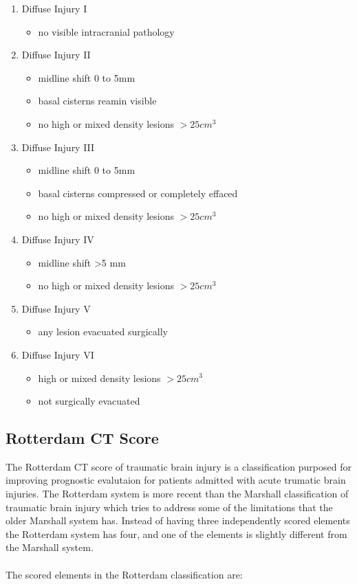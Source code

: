 \documentclass[11pt]{article}
\begin{document}
\begin{enumerate}
\item{Diffuse Injury I}
  \begin{itemize}
    \item{no visible intracranial pathology}
  \end{itemize}
\item{Diffuse Injury II}
  \begin{itemize}
   \item{midline shift 0 to 5mm}
    \item{basal cisterns reamin visible}
    \item{no high  or mixed density lesions $>25 cm^3$}
  \end{itemize}
\item{Diffuse Injury III}
  \begin{itemize}
    \item{midline shift 0 to 5mm}
    \item{basal cisterns compressed or completely effaced}
    \item{no high or mixed density lesions $>25cm^3$}
  \end{itemize}
\item{Diffuse Injury IV}
  \begin{itemize}
    \item{midline shift >5 mm}
    \item{no high or mixed density lesions $>25cm^3$}
  \end{itemize}
\item{Diffuse Injury V}
  \begin{itemize}
    \item{any lesion evacuated surgically}
  \end{itemize}
\item{Diffuse Injury VI}
  \begin{itemize}
    \item{high or mixed density lesions $>25cm^3$}
    \item{not surgically evacuated}
  \end{itemize}
\end{enumerate}

\subsection{Rotterdam CT Score}
The Rotterdam CT score of traumatic brain injury is a classification purposed for improving prognostic evalutaion for patients admitted with acute trumatic brain injuries. The Rotterdam system is more recent than the Marshall classification of traumatic brain injury which tries to address some of the limitations that the older Marshall system has. Instead of having three independently scored elements the Rotterdam system has four, and one of the elements is slightly different from the Marshall system.\\
\\
The scored elements in the Rotterdam classification are:
\end{document}
